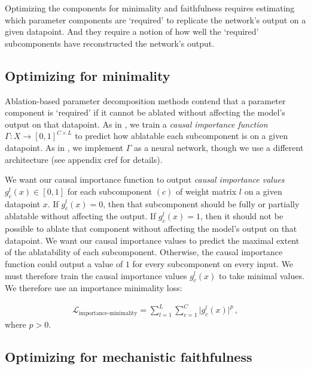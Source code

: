 \documentclass{article}
\begin{document}

Optimizing the components for minimality and faithfulness requires estimating which parameter components are `required' to replicate the network's output on a given datapoint. And they require a notion of how well the `required' subcomponents have reconstructed the network's output. 
\subsection{Optimizing for minimality}

Ablation-based parameter decomposition methods contend that a parameter component is `required' if it cannot be ablated without affecting the model's output on that datapoint. As in \cite{bushnaq2025spd}, we train a \textit{causal importance function} $\Gamma: X \rightarrow [0,1]^{C \times L}$ to predict how ablatable each subcomponent is on a given datapoint. As in \cite{bushnaq2025spd}, we implement $\Gamma$ as a neural network, though we use a different architecture (see appendix cref for details). 

We want our causal importance function to output \textit{causal importance values} $g^l_c(x)\in[0,1]$ for each subcomponent $(c)$ of weight matrix $l$ on a given datapoint $x$. If $g^l_c(x) = 0$, then that subcomponent should be fully or partially ablatable without affecting the output. If $g^l_c(x) = 1$, then it should not be possible to ablate that component without affecting the model's output on that datapoint. We want our causal importance values to predict the maximal extent of the ablatability of each subcomponent. Otherwise, the causal importance function could output a value of $1$ for every subcomponent on every input. We must therefore train the causal importance values $g^l_c(x)$ to take minimal values. We therefore use an importance minimality loss:

\begin{equation}\label{eq:minimal}
\begin{aligned}
\mathcal{L}_{\text{importance-minimality}}=\sum^L_{l=1}\sum^C_{c=1} \vert g^l_c(x) \vert^p\,,
\end{aligned}
\end{equation}
where $p>0$.
\subsection{Optimizing for mechanistic faithfulness}
\end{document}
